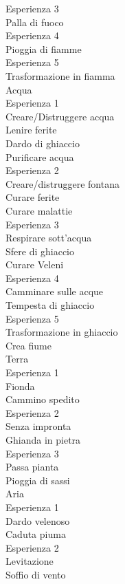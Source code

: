 \documentclass[12pt,a4paper]{book}
\begin{document}
Esperienza 3\\
Palla di fuoco\\

Esperienza 4\\
Pioggia di fiamme\\

Esperienza 5\\
Trasformazione in fiamma\\

Acqua\\

Esperienza 1\\
Creare/Distruggere acqua\\
Lenire ferite\\
Dardo di ghiaccio\\
Purificare acqua\\


Esperienza 2\\
Creare/distruggere fontana\\
Curare ferite\\
Curare malattie\\


Esperienza 3\\
Respirare sott'acqua\\
Sfere di ghiaccio\\
Curare Veleni\\

Esperienza 4\\
Camminare sulle acque\\
Tempesta di ghiaccio\\


Esperienza 5\\
Trasformazione in ghiaccio\\
Crea fiume\\

Terra\\

Esperienza 1\\
Fionda\\
Cammino spedito\\

Esperienza 2\\
Senza impronta\\
Ghianda in pietra\\

Esperienza 3\\
Passa pianta\\
Pioggia di sassi\\

Aria\\

Esperienza 1\\
Dardo velenoso\\
Caduta piuma\\

Esperienza 2\\
Levitazione\\
Soffio di vento\\
\end{document}

